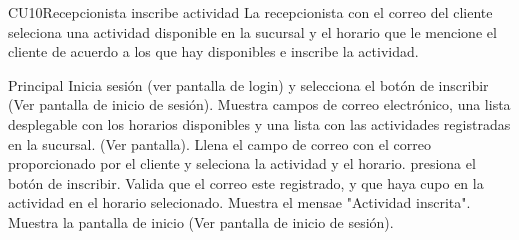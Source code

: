 

	\begin{UseCase}{CU10}{Recepcionista inscribe actividad}{
		La recepcionista con el correo del cliente seleciona una actividad disponible en la sucursal y el horario que le mencione el cliente de acuerdo a los que hay disponibles e inscribe la actividad.
	}
	\end{UseCase}
	\begin{UCtrayectoria}{Principal}
		\UCpaso[\UCactor] Inicia sesión (ver pantalla de login) y selecciona el botón de inscribir (Ver pantalla de inicio de sesión).
		\UCpaso Muestra campos de correo electrónico, una lista desplegable con los horarios disponibles y una lista con las actividades registradas en la sucursal. (Ver pantalla).
		\UCpaso[\UCactor] Llena el campo de correo con el correo proporcionado por el cliente y seleciona la actividad y el horario.
		\UCpaso[\UCactor] presiona el botón de inscribir.
		\UCpaso Valida que el correo este registrado, y que haya cupo en la actividad en el horario selecionado.			\UCpaso Muestra el mensae "Actividad inscrita".
		\UCpaso Muestra la pantalla de inicio (Ver pantalla de inicio de sesión).
	\end{UCtrayectoria}


